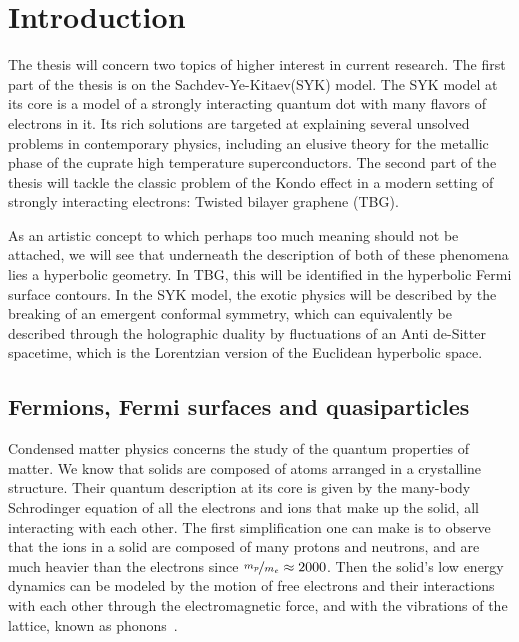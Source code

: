 \chapter{Introduction}
\label{ch:Intro}

\par
The thesis will concern two topics of higher interest in current research. The first part of the thesis is on the Sachdev-Ye-Kitaev(SYK) model. The SYK model at its core is a model of a strongly interacting quantum dot with many flavors of electrons in it. Its rich solutions are targeted at explaining several unsolved problems in contemporary physics, including an elusive theory for the metallic phase of the cuprate high temperature  superconductors. 
The second part of the thesis will tackle the classic problem of the Kondo effect in a modern setting of strongly interacting electrons: Twisted bilayer graphene (TBG). 

\par 
As an artistic concept to which perhaps too much meaning should not be attached, we will see that underneath the description of both of these phenomena lies a hyperbolic geometry. In TBG, this will be identified in the hyperbolic Fermi surface contours. In the SYK model, the exotic physics will be described by the breaking of an emergent conformal symmetry, which can equivalently be described through the holographic duality by fluctuations of an Anti de-Sitter spacetime, which is the Lorentzian version of the Euclidean hyperbolic space.  

\newpage


\section{Fermions, Fermi surfaces and quasiparticles}

Condensed matter physics concerns the study of the quantum properties of matter. We know that solids are composed of atoms arranged in a crystalline structure. Their quantum description at its core is given by the many-body Schrodinger equation of all the electrons and ions that make up the solid, all interacting with each other. The first simplification one can make is to observe that the ions in a solid are composed of many protons and neutrons, and are much heavier than the electrons since $\nicefrac{m_p}{m_e} \approx 2000$. Then the solid's low energy dynamics can be modeled by the motion of free electrons and their interactions with each other through the electromagnetic force, and with the vibrations of the lattice, known as phonons~\cite{oppenheimer1927quantentheorie}. 

